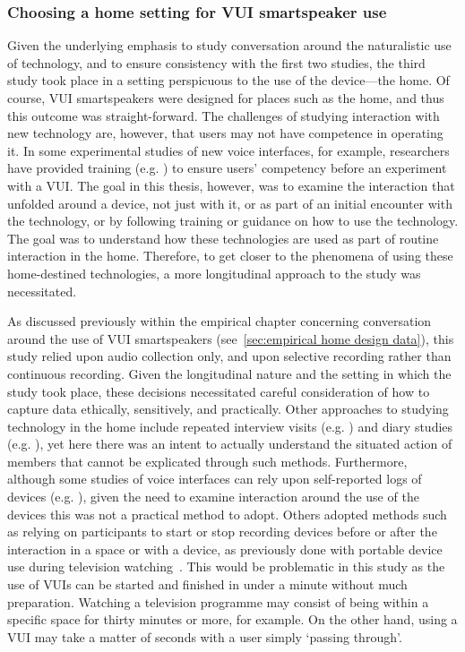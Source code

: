\subsubsection{Choosing a home setting for VUI smartspeaker use}\label{sec:synopsis discussion method setting home}
\begin{revisedsubmission}
Given the underlying emphasis to study conversation around the naturalistic use of technology, and to ensure consistency with the first two studies, the third study took place in a setting perspicuous to the use of the device---the home.
Of course, \ac{VUI} smartspeakers were designed for places such as the home, and thus this outcome was straight-forward.
The challenges of studying interaction with new technology are, however, that users may not have competence in operating it.
In some experimental studies of new voice interfaces, for example, researchers have provided training (e.g. \citet{Molnar1996,Schaffer2015}) to ensure users' competency before an experiment with a \ac{VUI}.
The goal in this thesis, however, was to examine the interaction that unfolded around a device, not just with it, or as part of an initial encounter with the technology, or by following training or guidance on how to use the technology.
The goal was to understand how these technologies are used as part of routine interaction in the home. 
Therefore, to get closer to the phenomena of using these home-destined technologies, a more longitudinal approach to the study was necessitated.

As discussed previously within the empirical chapter concerning conversation around the use of \ac{VUI} smartspeakers (see~\ref{sec:empirical home design data}), this study relied upon audio collection only, and upon selective recording rather than continuous recording.
Given the longitudinal nature and the setting in which the study took place, these decisions necessitated careful consideration of how to capture data ethically, sensitively, and practically. Other approaches to studying technology in the home include repeated interview visits (e.g. \citet{Fuentes2019}) and diary studies (e.g. \citet{Forlizzi2007,Jokela2015b}), yet here there was an intent to actually understand the situated action of members that cannot be explicated through such methods.
Furthermore, although some studies of voice interfaces can rely upon self-reported logs of devices (e.g. \citet{Ammari2019}), given the need to examine interaction around the use of the devices this was not a practical method to adopt.
Others adopted methods such as relying on participants to start or stop recording devices before or after the interaction in a space or with a device, as previously done with portable device use during television watching~\citep{Rooksby2015}.
This would be problematic in this study as the use of \acp{VUI} can be started and finished in under a minute without much preparation.
Watching a television programme may consist of being within a specific space for thirty minutes or more, for example.
On the other hand, using a \ac{VUI} may take a matter of seconds with a user simply `passing through'.


\end{revisedsubmission}
